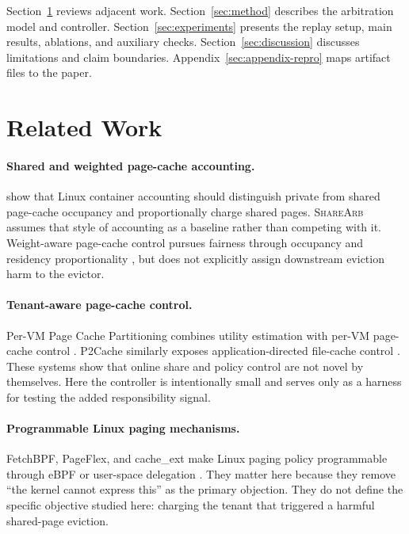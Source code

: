 \documentclass{article}
\newcommand{\sharearb}{\textsc{ShareArb}\xspace}
\begin{document}
Section~\ref{sec:related} reviews adjacent work. Section~\ref{sec:method} describes the arbitration model and controller. Section~\ref{sec:experiments} presents the replay setup, main results, ablations, and auxiliary checks. Section~\ref{sec:discussion} discusses limitations and claim boundaries. Appendix~\ref{sec:appendix-repro} maps artifact files to the paper.

\section{Related Work}
\label{sec:related}

\paragraph{Shared and weighted page-cache accounting.}
\citet{wang2024pcache} show that Linux container accounting should distinguish private from shared page-cache occupancy and proportionally charge shared pages. \sharearb assumes that style of accounting as a baseline rather than competing with it. Weight-aware page-cache control pursues fairness through occupancy and residency proportionality \citep{park2020justitia}, but does not explicitly assign downstream eviction harm to the evictor.

\paragraph{Tenant-aware page-cache control.}
Per-VM Page Cache Partitioning combines utility estimation with per-VM page-cache control \citep{sharma2016pervm}. P2Cache similarly exposes application-directed file-cache control \citep{lee2023p2cache}. These systems show that online share and policy control are not novel by themselves. Here the controller is intentionally small and serves only as a harness for testing the added responsibility signal.

\paragraph{Programmable Linux paging mechanisms.}
FetchBPF, PageFlex, and cache\_ext make Linux paging policy programmable through eBPF or user-space delegation \citep{cao2024fetchbpf,yelam2025pageflex,zussman2025cacheext}. They matter here because they remove ``the kernel cannot express this'' as the primary objection. They do not define the specific objective studied here: charging the tenant that triggered a harmful shared-page eviction.
\end{document}
